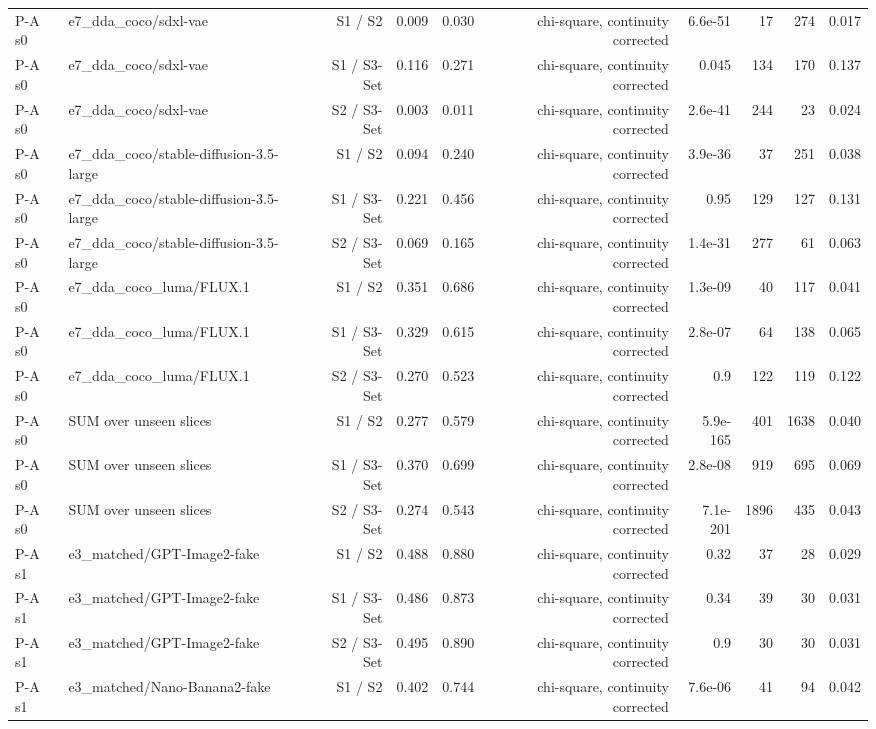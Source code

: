 \begin{table}[htbp]
\begin{tabular}{llrrrrrrrr}
P-A s0 & e7\_dda\_coco/sdxl-vae & S1 / S2 & 0.009 & 0.030 & chi-square, continuity corrected & 6.6e-51 & 17 & 274 & 0.017 \\
P-A s0 & e7\_dda\_coco/sdxl-vae & S1 / S3-Set & 0.116 & 0.271 & chi-square, continuity corrected & 0.045 & 134 & 170 & 0.137 \\
P-A s0 & e7\_dda\_coco/sdxl-vae & S2 / S3-Set & 0.003 & 0.011 & chi-square, continuity corrected & 2.6e-41 & 244 & 23 & 0.024 \\
P-A s0 & e7\_dda\_coco/stable-diffusion-3.5-large & S1 / S2 & 0.094 & 0.240 & chi-square, continuity corrected & 3.9e-36 & 37 & 251 & 0.038 \\
P-A s0 & e7\_dda\_coco/stable-diffusion-3.5-large & S1 / S3-Set & 0.221 & 0.456 & chi-square, continuity corrected & 0.95 & 129 & 127 & 0.131 \\
P-A s0 & e7\_dda\_coco/stable-diffusion-3.5-large & S2 / S3-Set & 0.069 & 0.165 & chi-square, continuity corrected & 1.4e-31 & 277 & 61 & 0.063 \\
P-A s0 & e7\_dda\_coco\_luma/FLUX.1 & S1 / S2 & 0.351 & 0.686 & chi-square, continuity corrected & 1.3e-09 & 40 & 117 & 0.041 \\
P-A s0 & e7\_dda\_coco\_luma/FLUX.1 & S1 / S3-Set & 0.329 & 0.615 & chi-square, continuity corrected & 2.8e-07 & 64 & 138 & 0.065 \\
P-A s0 & e7\_dda\_coco\_luma/FLUX.1 & S2 / S3-Set & 0.270 & 0.523 & chi-square, continuity corrected & 0.9 & 122 & 119 & 0.122 \\
P-A s0 & SUM over unseen slices & S1 / S2 & 0.277 & 0.579 & chi-square, continuity corrected & 5.9e-165 & 401 & 1638 & 0.040 \\
P-A s0 & SUM over unseen slices & S1 / S3-Set & 0.370 & 0.699 & chi-square, continuity corrected & 2.8e-08 & 919 & 695 & 0.069 \\
P-A s0 & SUM over unseen slices & S2 / S3-Set & 0.274 & 0.543 & chi-square, continuity corrected & 7.1e-201 & 1896 & 435 & 0.043 \\
P-A s1 & e3\_matched/GPT-Image2-fake & S1 / S2 & 0.488 & 0.880 & chi-square, continuity corrected & 0.32 & 37 & 28 & 0.029 \\
P-A s1 & e3\_matched/GPT-Image2-fake & S1 / S3-Set & 0.486 & 0.873 & chi-square, continuity corrected & 0.34 & 39 & 30 & 0.031 \\
P-A s1 & e3\_matched/GPT-Image2-fake & S2 / S3-Set & 0.495 & 0.890 & chi-square, continuity corrected & 0.9 & 30 & 30 & 0.031 \\
P-A s1 & e3\_matched/Nano-Banana2-fake & S1 / S2 & 0.402 & 0.744 & chi-square, continuity corrected & 7.6e-06 & 41 & 94 & 0.042 \\

\end{tabular}
\end{table}
